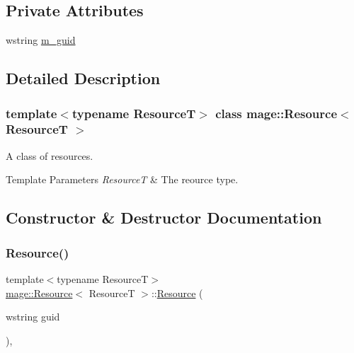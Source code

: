 \subsection*{Private Attributes}
\begin{DoxyCompactItemize}
\item 
wstring \hyperlink{classmage_1_1_resource_ac8cf21b8b48c47a104110e12e259ad99}{m\+\_\+guid}
\end{DoxyCompactItemize}


\subsection{Detailed Description}
\subsubsection*{template$<$typename ResourceT$>$\newline
class mage\+::\+Resource$<$ Resource\+T $>$}

A class of resources.


\begin{DoxyTemplParams}{Template Parameters}
{\em ResourceT} & The reource type. \\
\hline
\end{DoxyTemplParams}


\subsection{Constructor \& Destructor Documentation}
\hypertarget{classmage_1_1_resource_a397a81a1195dea231776db9787cad52d}{}\label{classmage_1_1_resource_a397a81a1195dea231776db9787cad52d} 
\subsubsection{\texorpdfstring{Resource()}{Resource()}\hspace{0.1cm}{\footnotesize\ttfamily [1/3]}}
{\footnotesize\ttfamily template$<$typename ResourceT$>$ \\
\hyperlink{classmage_1_1_resource}{mage\+::\+Resource}$<$ ResourceT $>$\+::\hyperlink{classmage_1_1_resource}{Resource} (\begin{DoxyParamCaption}\item[{wstring}]{guid }\end{DoxyParamCaption})\hspace{0.3cm}{\ttfamily [explicit]}, {\ttfamily [noexcept]}}

